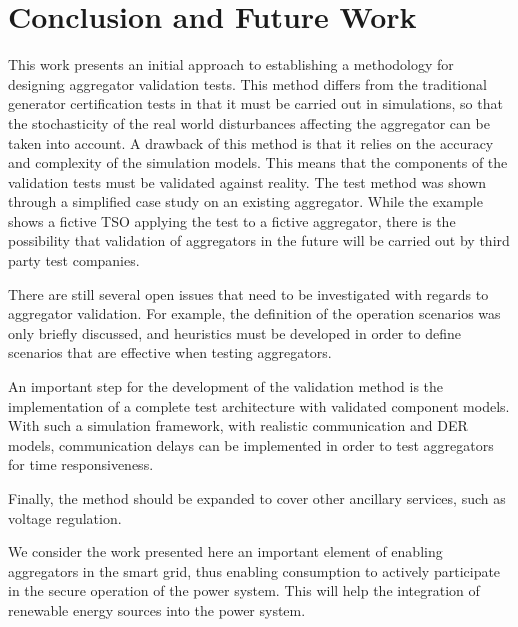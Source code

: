 \section{Conclusion and Future Work}
This work presents an initial approach to establishing a methodology for designing aggregator validation tests. This method differs from the traditional generator certification tests in that it must be carried out in simulations, so that the stochasticity of the real world disturbances affecting the aggregator can be taken into account. A drawback of this method is that it relies on the accuracy and complexity of the simulation models. This means that the components of the validation tests must be validated against reality. The test method was shown through a simplified case study on an existing aggregator. While the example shows a fictive TSO applying the test to a fictive aggregator, there is the possibility that validation of aggregators in the future will be carried out by third party test companies. 

There are still several open issues that need to be investigated with regards to aggregator validation. For example, the definition of the operation scenarios was only briefly discussed, and heuristics must be developed in order to define scenarios that are effective when testing aggregators.

An important step for the development of the validation method is the implementation of a complete test architecture with validated component models. With such a simulation framework, with realistic communication and DER models, communication delays can be implemented in order to test aggregators for time responsiveness. 

Finally, the method should be expanded to cover other ancillary services, such as voltage regulation.

We consider the work presented here an important element of enabling aggregators in the smart grid, thus enabling consumption to actively participate in the secure operation of the power system. This will help the integration of renewable energy sources into the power system.
